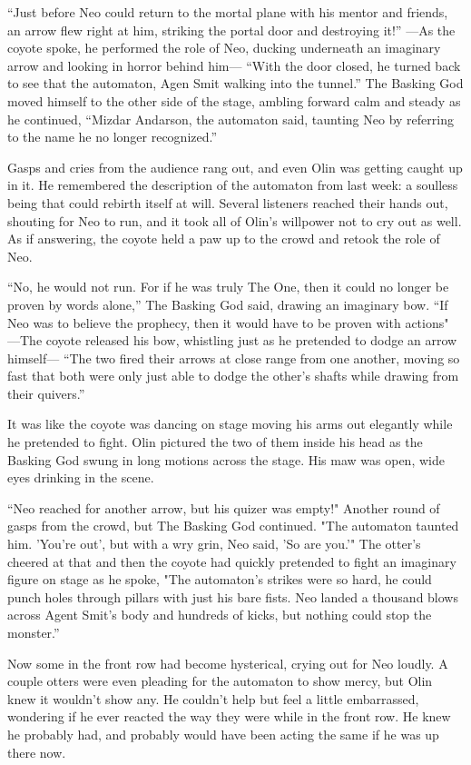 ``Just before Neo could return to the mortal plane with his mentor and friends, an arrow flew right at him, striking the portal door and destroying it!'' ---As the coyote spoke, he performed the role of Neo, ducking underneath an imaginary arrow and looking in horror behind him--- ``With the door closed, he turned back to see that the automaton, Agen Smit walking into the tunnel.'' The Basking God moved himself to the other side of the stage, ambling forward calm and steady as he continued, ``Mizdar Andarson, the automaton said, taunting Neo by referring to the name he no longer recognized.''

Gasps and cries from the audience rang out, and even Olin was getting caught up in it. He remembered the description of the automaton from last week: a soulless being that could rebirth itself at will. Several listeners reached their hands out, shouting for Neo to run, and it took all of Olin's willpower not to cry out as well. As if answering, the coyote held a paw up to the crowd and retook the role of Neo.

``No, he would not run. For if he was truly The One, then it could no longer be proven by words alone,'' The Basking God said, drawing an imaginary bow. ``If Neo was to believe the prophecy, then it would have to be proven with actions" ---The coyote released his bow, whistling just as he pretended to dodge an arrow himself--- ``The two fired their arrows at close range from one another, moving so fast that both were only just able to dodge the other's shafts while drawing from their quivers.''

It was like the coyote was dancing on stage moving his arms out elegantly while he pretended to fight. Olin pictured the two of them inside his head as the Basking God swung in long motions across the stage. His maw was open, wide eyes drinking in the scene.

``Neo reached for another arrow, but his quizer was empty!" Another round of gasps from the crowd, but The Basking God continued. "The automaton taunted him. 'You're out', but with a wry grin, Neo said, 'So are you.'" The otter's cheered at that and then the coyote had quickly pretended to fight an imaginary figure on stage as he spoke, "The automaton's strikes were so hard, he could punch holes through pillars with just his bare fists. Neo landed a thousand blows across Agent Smit's body and hundreds of kicks, but nothing could stop the monster.''

Now some in the front row had become hysterical, crying out for Neo loudly. A couple otters were even pleading for the automaton to show mercy, but Olin knew it wouldn't show any. He couldn't help but feel a little embarrassed, wondering if he ever reacted the way they were while in the front row. He knew he probably had, and probably would have been acting the same if he was up there now.

